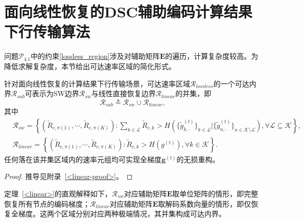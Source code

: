 \section{面向线性恢复的DSC辅助编码计算结果下行传输算法}\label{4.4}
 问题$\mathcal{P}_{4.1}$中的约束\eqref{lossless_region}涉及对辅助矩阵$\mathbf{E}$的遍历，计算复杂度较高。为降低求解复杂度，本节给出可达速率区域的简化形式。
\begin{theorem}\label{<linear>}
	针对面向线性恢复的计算结果下行传输场景，可达速率区域$\mathcal{R}_{lossless}$的一个可达内界$\mathcal{R}_{sub}$可表示为SW边界$\mathcal{R}_{sw}$与线性直接恢复边界$\mathcal{R}_{linear}$的并集，即
	\begin{equation}
		\mathcal{R}_{sub} \triangleq \mathcal{R}_{sw} \cup \mathcal{R}_{linear},
	\end{equation}
	其中
	\begin{align}
		&\mathcal{R}_{sw}=\left\{(\tilde{R}_{c,\pi(1)},\cdots,\tilde{R}_{c,\pi(K)}):\sum_{k\in\mathcal{L}}\tilde{R}_{c,k}> H\left(\{\tilde{g}_{k,\cdot}^{(t)}\}_{k\in\mathcal{L}}|\{\tilde{g}_{n,\cdot}^{(t)}\}_{n\in\mathcal{K}\setminus\mathcal{L}}\right), \forall \mathcal{L}\subseteq \mathcal{K}\right\},\label{hsw}\\
			&\mathcal{R}_{linear}=\left\{(\tilde{R}_{c,\pi(1)},\cdots,\tilde{R}_{c,\pi(K)}): \tilde{R}_{c,k}>H(g^{(t)}),\forall k\in
			\mathcal{K}\right\}.\label{hlinear}
		\end{align}
		任何落在该并集区域内的速率元组均可实现全梯度$\mathbf{g}^{(t)}$的无损重构。
	\end{theorem}
	\begin{proof}
		推导见附录~\ref{<linear-proof>}。
	\end{proof}

  定理~\ref{<linear>}的直观解释如下，$\mathcal{R}_{sw}$对应辅助矩阵$\mathbf{E}$取单位矩阵的情形，即完整恢复所有节点的编码梯度；$\mathcal{R}_{linear}$对应辅助矩阵$\mathbf{E}$取解码系数向量的情形，即仅恢复全梯度。这两个区域分别对应两种极端情况，其并集构成可达内界。

